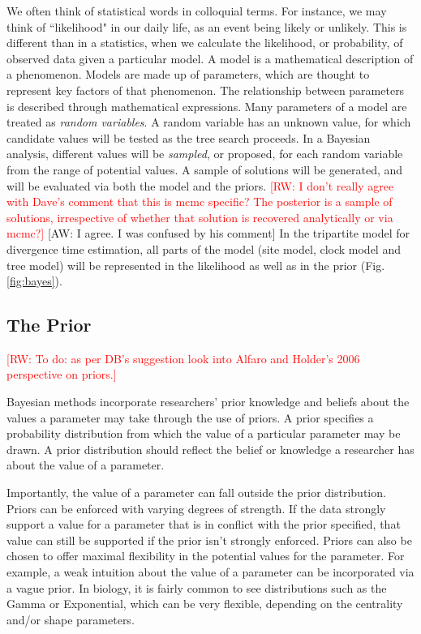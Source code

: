 \documentclass[11pt]{article}
\newcommand{\rw}[1]{{\textcolor{red}{[RW: #1]}}} %
\newcommand{\aw}[1]{{\textcolor{armygreen}{[AW: #1]}}} %
\begin{document}
We often think of statistical words in colloquial terms.
For instance, we may think of ``likelihood" in our daily life, as an event being likely or unlikely. 
This is different than in a statistics, when we calculate the likelihood, or probability, of observed data given a particular model.
A model is a mathematical description of a phenomenon.
Models are made up of parameters, which are thought to represent key factors of that phenomenon.
The relationship between parameters is described through mathematical expressions.
Many parameters of a model are treated as \textit{random variables}.
A random variable has an unknown value, for which candidate values will be tested as the tree search proceeds. 
In a Bayesian analysis, different values will be \textit{sampled}, or proposed, for each random variable from the range of potential values.
A sample of solutions will be generated, and will be evaluated via both the model and the priors. \rw{I don't really agree with Dave's comment that this is mcmc specific? The posterior is a sample of solutions, irrespective of whether that solution is recovered analytically or via mcmc?} \aw{I agree. I was confused by his comment}
In the tripartite model for divergence time estimation, all parts of the model (site model, clock model and tree model) will be represented in the likelihood as well as in the prior (Fig. \ref{fig:bayes}).


\subsection{The Prior}

\rw{To do: as per DB's suggestion look into Alfaro and Holder's 2006 perspective on priors.}

Bayesian methods incorporate researchers' prior knowledge and beliefs about the values a parameter may take through the use of priors.
A prior specifies a probability distribution from which the value of a particular parameter may be drawn.
A prior distribution should reflect the belief or knowledge a researcher has about the value of a parameter.

Importantly, the value of a parameter can fall outside the prior distribution.
Priors can be enforced with varying degrees of strength.
If the data strongly support a value for a parameter that is in conflict with the prior specified, that value can still be supported if the prior isn't strongly enforced.
Priors can also be chosen to offer maximal flexibility in the potential values for the parameter.
For example, a weak intuition about the value of a parameter can be incorporated via a vague prior.
In biology, it is fairly common to see distributions such as the Gamma or Exponential, which can be very flexible, depending on the centrality and/or shape parameters.
\end{document}
